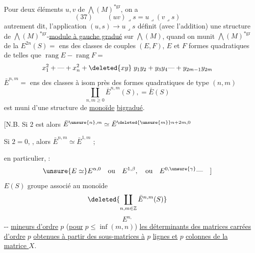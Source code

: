 Pour deux éléments $u,v$ de $\bigwedge(M)^{*\mathrm{gr}}$, on a
\[
(37)\qquad(uv)\lrcorner s=u\lrcorner(v\lrcorner s)
\]
autrement dit, l'application $(u,s)\longrightarrow u\lrcorner s$ définit (avec l'addition) une structure de $\bigwedge(M)^{*\mathrm{gr}}$-\uline{module à gauche gradué} sur $\bigwedge(M)$, quand on munit $\bigwedge(M)^{*\mathrm{gr}}$ de la
$E^{2n}(S)=$ ens des classes de couples $(E,F)$, $E$ et $F$ formes quadratiques  de    telles que $\operatorname{rang}E-\operatorname{rang}F=$
\[
x_1^2+\text{---}+x_n^2+\deleted{xy}\;y_1y_2+y_3y_4\text{---}+y_{2m-1}y_{2m}
\]
$\bar E^{n,m}=$ ens des classes à isom près des formes quadratiques  de type $(n,m)$
\[
\coprod_{n,m\geq0}\bar E^{n,m}(S),=\bar E(S)
\]
est muni d’une structure de \uline{monoïde} \uline{bigradué}.

 [N.B. Si $2$ est  alors $\bar E^{\unsure{n},m}\simeq\bar E^{\deleted{\unsure{m}}n+2m,0}$

Si $2=0$, , alors $\bar E^{n,m}\simeq\bar E^{1,m}$ ;


en particulier,  : 
\[
\unsure{E\simeq}E^{\alpha,0}\quad\text{ou}\quad E^{1,\beta},\quad\text{ou}\quad E^{0,\unsure{\gamma}}\text{---}\quad]
\]
$E(S)$ groupe associé au monoïde
\[
\deleted{\coprod_{n,m\in\mathbb Z}\bar E^{n,m}(S)}
\]
\[
E^{n,}
\]
--
\uline{mineurs d’ordre} $p$ (\uline{pour} $p\leq\inf(m,n)$) \uline{les déterminants des matrices carrées d’ordre} $p$ \uline{obtenues à partir des sous-matrices à} $p$ \uline{lignes et} $p$ \uline{colonnes de la matrice $X$}.

